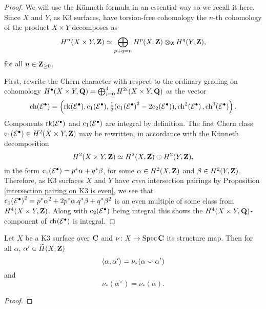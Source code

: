 \begin{proof}
    We will use the Künneth formula in an essential way so we recall it here. Since $X$ and $Y$, as K3 surfaces, have torsion-free cohomology the $n$-th cohomology of the product $X \times Y$ decomposes as
    \[
        H^n(X \times Y, \mathbf Z) \simeq \bigoplus_{p+q = n} H^p(X, \mathbf Z) \otimes_\mathbf Z H^q(Y, \mathbf Z),
    \] 
    for all $n \in \mathbf Z_{\geq 0}$.
    
    First, rewrite the Chern character with respect to the ordinary grading on cohomology $H^\bullet(X \times Y, \mathbf Q) = \bigoplus_{i=0}^4 H^{2i}(X \times Y, \mathbf Q)$ as the vector
    \[
        \ch{\E^\bullet} = \left(\rk{\E^\bullet}, \cclass[1](\E^\bullet), \tfrac{1}{2}(\cclass[1]{\E^\bullet}^2 - 2\cclass[2]{\E^\bullet}), \ch[2]{\E^\bullet}, \ch[3]{\E^\bullet} \right).
    \]
    Components $\operatorname{rk}(\mathcal E^\bullet)$ and $\cclass[1]{\E^\bullet}$ are integral by definition. The first Chern class $\cclass[1]{\E^\bullet} \in H^2(X\times Y, \Z)$ may be rewritten, in accordance with the Künneth decomposition
    \[
        H^2(X\times Y, \mathbf Z) \simeq H^2(X, \mathbf Z) \oplus H^2(Y, \mathbf Z),
    \]
    in the form $\cclass[1]{\E^\bullet} = p^*\alpha + q^*\beta$, for some $\alpha \in H^2(X, \mathbf Z)$ and $\beta \in H^2(Y, \mathbf Z)$. Therefore, as K3 surfaces $X$ and $Y$ have \emph{even} intersection pairings by Proposition \ref{intersection pairing on K3 is even}, we see that $\cclass[1]{\E^\bullet}^2 = p^*\alpha^2 + 2 p^*\alpha.q^*\beta + q^*\beta^2$ is an even multiple of some class from $H^{4}(X \times Y, \mathbf Z)$. Along with $\cclass[2]{\E^\bullet}$ being integral this shows the $H^4(X \times Y, \mathbf Q)$-component of $\ch[](\E^\bullet)$ is integral.

\end{proof}

\begin{lemma}
    \label{Intersection pairing through push-forward of structure map}
    Let $X$ be a K3 surface over $\mathbf C$ and $\nu \colon X \to \operatorname{Spec}\mathbf C$ its structure map. Then for all $\alpha$, $\alpha' \in \widetilde{H}(X, \mathbf Z)$
    \[
        \langle \alpha, \alpha' \rangle = \nu_*(\alpha \smallsmile \alpha')
    \] 
    and 
    \[
        \nu_*(\alpha^\vee) = \nu_*(\alpha). 
    \]
\end{lemma}

\begin{proof}

\end{proof}

